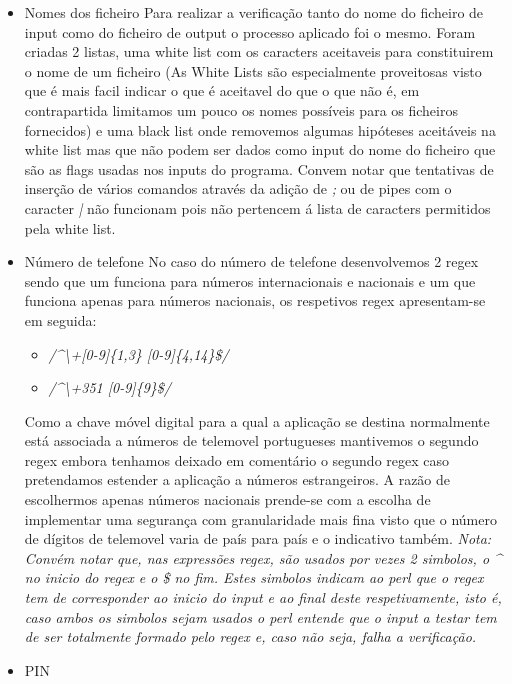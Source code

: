 \begin{itemize}
\item Nomes dos ficheiro\newline
 Para realizar a verificação tanto do nome do ficheiro de input como do ficheiro de output o processo aplicado foi o mesmo. Foram criadas 2 listas, uma white list com os caracters aceitaveis para constituirem o nome de um ficheiro (As White Lists são especialmente proveitosas visto que é mais facil indicar o que é aceitavel do que o que não é, em contrapartida limitamos um pouco os nomes possíveis para os ficheiros fornecidos) e uma black list onde removemos algumas hipóteses aceitáveis na white list mas que não podem ser dados como input do nome do ficheiro que são as flags usadas nos inputs do programa.\newline
 Convem notar que tentativas de inserção de vários comandos através da adição de \textit{;} ou de pipes com o caracter \textit{|} não funcionam pois não pertencem á lista de caracters permitidos pela white list.

\hfill\newline
\item Número de telefone\newline
 No caso do número de telefone desenvolvemos 2 regex sendo que um funciona para números internacionais e nacionais e um que funciona apenas para números nacionais, os respetivos regex apresentam-se em seguida:\newline
\begin{itemize}
	\item \textit{/\^{}\textbackslash+[0-9]\{1,3\} [0-9]\{4,14\}\$/}
	\item \textit{/\^{}\textbackslash+351 [0-9]\{9\}\$/}
\end{itemize}

\hfill\newline
\par Como a chave móvel digital para a qual a aplicação se destina normalmente está associada a números de telemovel portugueses mantivemos o segundo regex embora tenhamos deixado em comentário o segundo regex caso pretendamos estender a aplicação a números estrangeiros. A razão de escolhermos apenas números nacionais prende-se com a escolha de implementar uma segurança com granularidade mais fina visto que o número de dígitos de telemovel varia de país para país e o indicativo também.\newline
\textit{Nota: Convém notar que, nas expressões regex, são usados por vezes 2 simbolos, o \^{} no inicio do regex e o \$ no fim. Estes simbolos indicam ao perl que o regex tem de corresponder ao inicio do input e ao final deste respetivamente, isto é, caso ambos os simbolos sejam usados o perl entende que o input a testar tem de ser totalmente formado pelo regex e, caso não seja, falha a verificação.}\newline
\hfill\newline
\item PIN\newline


\end{itemize}
